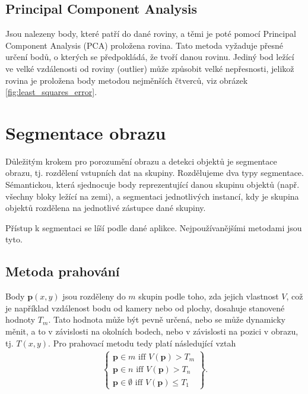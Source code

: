 \documentclass[twoside]{ctuthesis}
\begin{document}
\subsection{Principal Component Analysis}
Jsou nalezeny body, které patří do dané roviny, a těmi je poté pomocí Principal Component Analysis (PCA)\cite{Werner2020} proložena rovina. Tato metoda vyžaduje přesné určení bodů, o kterých se předpokládá, že tvoří danou rovinu. Jediný bod ležící ve velké vzdálenosti od roviny (outlier) může způsobit velké nepřesnosti, jelikož rovina je proložena body metodou nejměnších čtverců, viz obrázek \ref{fig:least_squares_error}.\cite{zhang2016fast}


\section{Segmentace obrazu}
\label{subsection:segmentation}
Důležitým krokem pro porozumění obrazu a detekci objektů je segmentace obrazu, tj. rozdělení vstupních dat na skupiny. Rozdělujeme dva typy segmentace. Sémantickou, která sjednocuje body reprezentující danou skupinu objektů (např. všechny bloky ležící na zemi), a segmentaci jednotlivých instancí, kdy je skupina objektů rozdělena na jednotlivé zástupce dané skupiny. 

    Přístup k segmentaci se líší podle dané aplikce. Nejpoužívanějšími metodami jsou tyto.
    \subsection{Metoda prahování} Body $\mathbf{p}(x,y)$ jsou rozděleny do $m$ skupin podle toho, zda jejich vlastnost $V$, což je například vzdálenost bodu od kamery nebo od plochy, dosahuje stanovené hodnoty $T_m$. Tato hodnota může být pevně určená, nebo se může dynamicky měnit, a to v závislosti na okolních bodech, nebo v závislosti na pozici v obrazu, tj. $T(x,y)$. Pro prahovací metodu tedy platí následující vztah\cite{segmentace_metody}
        \begin{align}
\left\{ 
        \begin{gathered}
            \mathbf{p} \in m \text{ iff } V(\mathbf{p}) > T_m \\
            \mathbf{p} \in n \text{ iff } V(\mathbf{p}) > T_n \\
            \mathbf{p} \in \emptyset \text{ iff } V(\mathbf{p}) \leq T_1 
        \end{gathered}
\right\}.
        \end{align}
 
\end{document}
